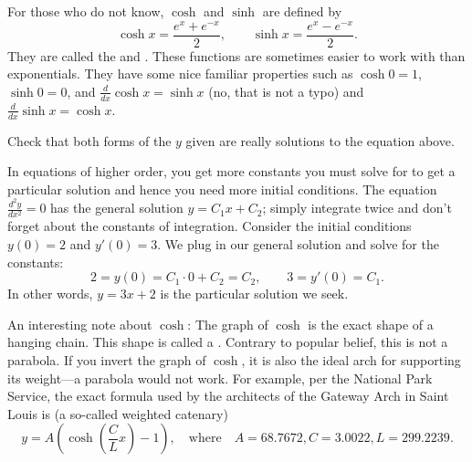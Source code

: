 For those who do not know, $\cosh$ and $\sinh$ are defined by
\begin{equation*}
\cosh x = \frac{e^{x} + e^{-x}}{2} , \qquad
\sinh x = \frac{e^{x} - e^{-x}}{2} .
\end{equation*}
They are called the
\emph{}
and
\emph{}.
These functions are sometimes easier to
work with than exponentials.  They have some nice familiar
properties such as
$\cosh 0 = 1$, $\sinh 0 = 0$, and $\frac{d}{dx} \cosh x = \sinh x$
(no, that is not a typo)
and $\frac{d}{dx} \sinh x = \cosh x$.

\begin{exercise}
Check that both forms of the $y$ given are
really solutions to the equation above.
\end{exercise}

\begin{example}
In equations of higher order, you get more constants you must solve for to
get a particular solution and hence you need more initial conditions.
The equation $\frac{d^2y}{dx^2} = 0$ has the
general solution $y = C_1 x + C_2$; simply integrate twice and don't forget
about the constants of integration.  Consider the initial conditions $y(0) =
2$ and $y'(0) = 3$.  We plug in our general solution and solve for the
constants:
\begin{equation*}
2 = y(0) = C_1 \cdot 0 + C_2 = C_2, \qquad
3 = y'(0) = C_1 .
\end{equation*}
In other words, $y = 3x + 2$ is the particular solution we seek.
\end{example}


An interesting note about $\cosh$:  The graph of $\cosh$ is the exact shape
of a hanging chain.  This shape is called
a \emph{}.
Contrary to popular belief, this is not a
parabola.  If you invert the graph of $\cosh$, it is also the ideal arch for
supporting its weight---a parabola would not work.
For example,
per the National Park Service,
the exact formula used by
the architects of the
Gateway Arch in Saint Louis is
(a so-called weighted catenary)
\begin{equation*}
y = A\left( \cosh \left( \frac{C}{L} x \right) - 1 \right), \quad
\text{where}
\quad
A=68.7672,
C=3.0022,
L = 299.2239.
\end{equation*}


